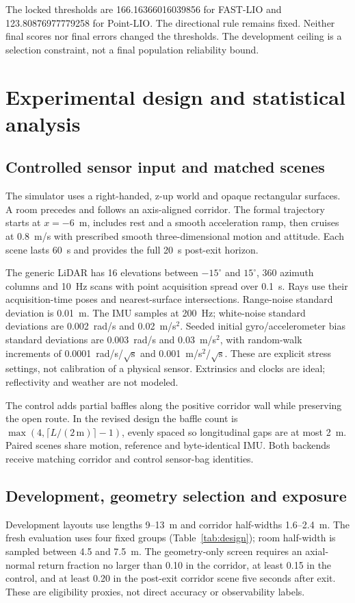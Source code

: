\documentclass[11pt,a4paper]{article}
\begin{document}
The locked thresholds are 166.16366016039856 for FAST-LIO and
123.80876977779258 for Point-LIO. The directional rule remains fixed.
Neither final scores nor final errors changed the thresholds. The development
ceiling is a selection constraint, not a final population reliability bound.

\section{Experimental design and statistical analysis}
\subsection{Controlled sensor input and matched scenes}
The simulator uses a right-handed, z-up world and opaque rectangular surfaces.
A room precedes and follows an axis-aligned corridor. The formal trajectory
starts at $x=-6$~m, includes rest and a smooth acceleration ramp, then cruises
at 0.8~m/s with prescribed smooth three-dimensional motion and attitude.
Each scene lasts 60~s and provides the full 20~s post-exit horizon.

The generic LiDAR has 16 elevations between $-15^\circ$ and $15^\circ$,
360 azimuth columns and 10~Hz scans with point acquisition spread over
0.1~s. Rays use their acquisition-time poses and nearest-surface intersections.
Range-noise standard deviation is 0.01~m. The IMU samples at 200~Hz;
white-noise standard deviations are 0.002~rad/s and 0.02~m/s$^2$.
Seeded initial gyro/accelerometer bias standard deviations are 0.003~rad/s
and 0.03~m/s$^2$, with random-walk increments of
0.0001~rad/s/$\sqrt{\mathrm s}$ and 0.001~m/s$^2$/$\sqrt{\mathrm s}$.
These are explicit stress settings, not calibration of a physical sensor.
Extrinsics and clocks are ideal; reflectivity and weather are not modeled.

The control adds partial baffles along the positive corridor wall while
preserving the open route. In the revised design the baffle count is
$\max(4,\lceil L/(2\,\mathrm m)\rceil-1)$, evenly spaced so longitudinal gaps
are at most 2~m. Paired scenes share motion, reference and byte-identical IMU.
Both backends receive matching corridor and control sensor-bag identities.

\subsection{Development, geometry selection and exposure}
Development layouts use lengths 9--13~m and corridor half-widths
1.6--2.4~m. The fresh evaluation uses four fixed groups
(Table~\ref{tab:design}); room half-width is sampled between 4.5 and 7.5~m.
The geometry-only screen requires an axial-normal return fraction no larger
than 0.10 in the corridor, at least 0.15 in the control, and at least 0.20
in the post-exit corridor scene five seconds after exit. These are eligibility
proxies, not direct accuracy or observability labels.
\end{document}
